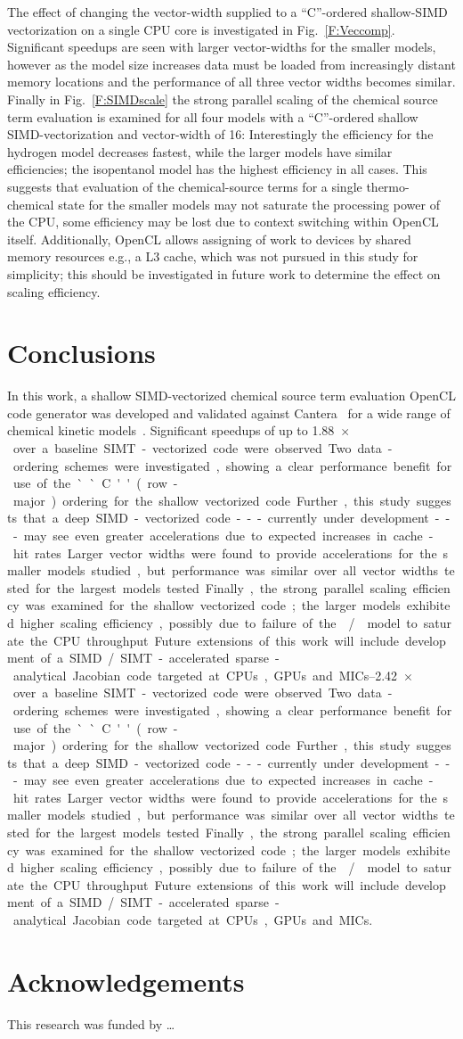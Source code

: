 \documentclass[12pt]{ussci}
\begin{document}
The effect of changing the vector-width supplied to a ``C''-ordered shallow-SIMD vectorization on a single CPU core is investigated in Fig.~\ref{F:Veccomp}.
Significant speedups are seen with larger vector-widths for the smaller models, however as the model size increases data must be loaded from increasingly distant memory locations and the performance of all three vector widths becomes similar.
Finally in Fig.~\ref{F:SIMDscale} the strong parallel scaling of the chemical source term evaluation is examined for all four models with a ``C''-ordered shallow SIMD-vectorization and vector-width of 16:
Interestingly the efficiency for the hydrogen model decreases fastest, while the larger models have similar efficiencies; the isopentanol model has the highest efficiency in all cases.
This suggests that evaluation of the chemical-source terms for a single thermo-chemical state for the smaller models may not saturate the processing power of the CPU, some efficiency may be lost due to context switching within OpenCL itself.
Additionally, OpenCL allows assigning of work to devices by shared memory resources e.g., a L3 cache, which was not pursued in this study for simplicity; this should be investigated in future work to determine the effect on scaling efficiency.

\section{Conclusions}
In this work, a shallow SIMD-vectorized chemical source term evaluation OpenCL code generator was developed and validated against Cantera~\cite{Cantera} for a wide range of chemical kinetic models~\cite{Burke:2011fh,smith_gri-mech_30,Wang:2007,Sarathy:2013jr}.
Significant speedups of up to \SIrange{1.88}{2.42}{$\times$} over a baseline SIMT-vectorized code were observed.
Two data-ordering schemes were investigated, showing a clear performance benefit for use of the ``C'' (row-major) ordering for the shallow vectorized code.
Further, this study suggests that a deep SIMD-vectorized code---currently under development---may see even greater accelerations due to expected increases in cache-hit rates.
Larger vector widths were found to provide accelerations for the smaller models studied, but performance was similar over all vector widths tested for the largest models tested.
Finally, the strong parallel scaling efficiency was examined for the shallow vectorized code; the larger models exhibited higher scaling efficiency, possibly due to failure of the \slash{} model to saturate the CPU throughput.
Future extensions of this work will include development of a SIMD\slash SIMT-accelerated sparse-analytical Jacobian code targeted at CPUs, GPUs and MICs.

\section{Acknowledgements}
This research was funded by \ldots

\printbibliography[heading=bibintoc]
\end{document}
